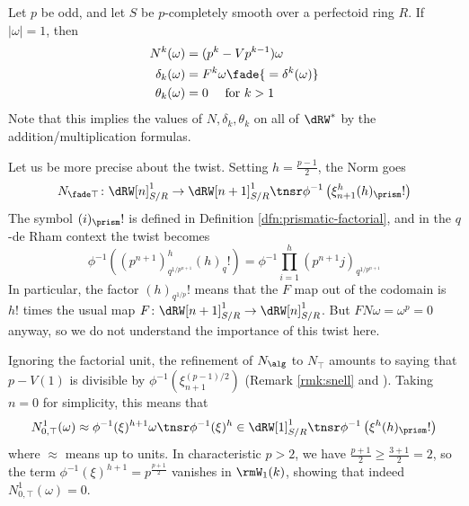 \begin{example}
  \label{ex:norm-dx}
  Let $p$ be odd, and let $S$ be $p$-completely smooth over a perfectoid ring $R$.
  If $|\omega|=1$, then
  \begin{align*}
    N^k(\omega) &= (p^k - Vp^{k-1})\omega\\
    \delta_k(\omega) &= F^k\omega \fade{{} = \delta^k(\omega)}\\
    \theta_k(\omega) &= 0 \quad \text{ for } k>1
  \end{align*}
  Note that this implies the values of $N,\delta_k,\theta_k$ on all of $\dRW^*$ by the addition/multiplication formulas.

  Let us be more precise about the twist. Setting $h=\frac{p-1}2$, the Norm goes
  \[ N_{\fade\top} \colon \dRW[n]^1_{S/R} \to \dRW[n+1]^1_{S/R} \tnsr \phi^{-1}\left(\xi_{n+1}^h(h)_\prism!\right) \]
  The symbol $(i)_\prism!$ is defined in Definition \ref{dfn:prismatic-factorial}, and in the $q$-de Rham context the twist becomes
  \[ \phi^{-1}\left((p^{n+1})^h_{q^{1/p^{n+1}}} (h)_q!\right) = \phi^{-1}\prod_{i=1}^h (p^{n+1}j)_{q^{1/p^{n+1}}} \]
  In particular, the factor $(h)_{q^{1/p}}!$ means that the $F$ map out of the codomain is $h!$ times the usual map $F\colon \dRW[n+1]^1_{S/R} \to \dRW[n]^1_{S/R}$. But $FN\omega = \omega^p = 0$ anyway, so we do not understand the importance of this twist here.

  Ignoring the factorial unit, the refinement of $N_\alg$ to $N_\top$ amounts to saying that $p-V(1)$ is divisible by $\phi^{-1}\left(\xi_{n+1}^{(p-1)/2}\right)$ (Remark \ref{rmk:snell} and \cite[Lemma 2.1]{MaoLogarithm}). Taking $n=0$ for simplicity, this means that
  \[ N^1_{0,\top}(\omega) \approx \phi^{-1}(\xi)^{h+1}\omega \tnsr \phi^{-1}(\xi)^h \in \dRW[1]^1_{S/R} \tnsr \phi^{-1}\left(\xi^h (h)_\prism!\right) \]
  where $\approx$ means up to units.
  In characteristic $p>2$, we have $\frac{p+1}2 \ge \frac{3+1}2 = 2$, so the term $\phi^{-1}(\xi)^{h+1} = p^{\frac{p+1}2}$ vanishes in $\rmW_1(k)$, showing that indeed $N^1_{0,\top}(\omega)=0$.
\end{example}

